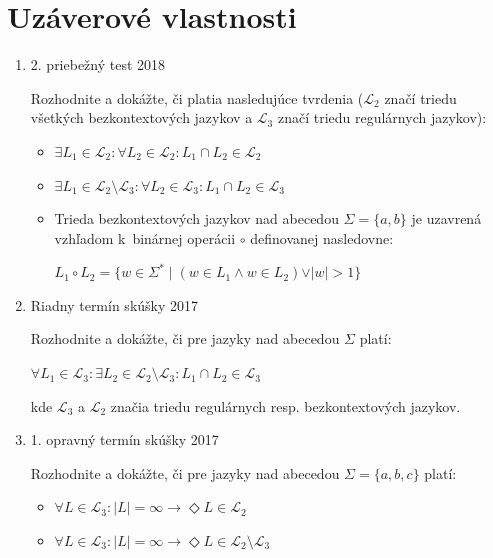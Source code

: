 \documentclass[11pt,a4paper]{article}
\begin{document}
	\section{Uzáverové vlastnosti}
	\begin{enumerate}
		\item 2. priebežný test 2018

		Rozhodnite a dokážte, či platia nasledujúce tvrdenia ($\mathcal{L}_2$ značí triedu všetkých bezkontextových jazykov a $\mathcal{L}_3$ značí triedu regulárnych jazykov):

		\begin{itemize}
			\item $\exists L_1 \in \mathcal{L}_2: \forall L_2 \in \mathcal{L}_2: L_1 \cap L_2 \in \mathcal{L}_2$

			\item $\exists L_1 \in \mathcal{L}_2 \setminus \mathcal{L}_3: \forall L_2 \in \mathcal{L}_3: L_1 \cap L_2 \in \mathcal{L}_3$

			\item Trieda bezkontextových jazykov nad abecedou $\Sigma = \{a,b\}$ je uzavrená vzhľadom k~binárnej operácii $\circ$ definovanej nasledovne:

			$L_1 \circ L_2 = \{w \in \Sigma^* \mid (w \in L_1 \land w \in L_2) \lor \vert w \vert > 1\}$
		\end{itemize}

		\item Riadny termín skúšky 2017

		Rozhodnite a dokážte, či pre jazyky nad abecedou $\Sigma$ platí:

		$\forall L_1 \in \mathcal{L}_3: \exists L_2 \in \mathcal{L}_2 \setminus \mathcal{L}_3: L_1 \cap L_2 \in \mathcal{L}_3$

		kde $\mathcal{L}_3$ a $\mathcal{L}_2$ značia triedu regulárnych resp. bezkontextových jazykov.

		\item 1. opravný termín skúšky 2017

		Rozhodnite a dokážte, či pre jazyky nad abecedou $\Sigma = \{a,b,c\}$ platí:

		\begin{itemize}
			\item $\forall L \in \mathcal{L}_3: \vert L \vert = \infty \rightarrow \Diamond L \in  \mathcal{L}_2$
			\item $\forall L \in \mathcal{L}_3: \vert L \vert = \infty \rightarrow \Diamond L \in  \mathcal{L}_2 \setminus \mathcal{L}_3$
		\end{itemize}


\end{enumerate}
\end{document}
